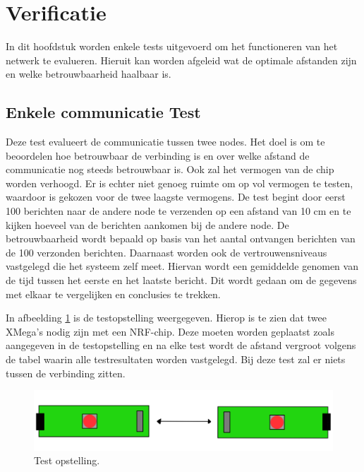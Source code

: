 \section{Verificatie}\label{sec:tests}

In dit hoofdstuk worden enkele tests uitgevoerd om het functioneren van het netwerk te evalueren. Hieruit kan worden afgeleid wat de optimale afstanden zijn en welke betrouwbaarheid haalbaar is.

\subsection{Enkele communicatie Test}
Deze test evalueert de communicatie tussen twee nodes. Het doel is om te beoordelen hoe betrouwbaar de verbinding is en over welke afstand de communicatie nog steeds betrouwbaar is. Ook zal het vermogen van de chip worden verhoogd. Er is echter niet genoeg ruimte om op vol vermogen te testen, waardoor is gekozen voor de twee laagste vermogens. De test begint door eerst 100 berichten naar de andere node te verzenden op een afstand van 10 cm en te kijken hoeveel van de berichten aankomen bij de andere node. De betrouwbaarheid wordt bepaald op basis van het aantal ontvangen berichten van de 100 verzonden berichten. Daarnaast worden ook de vertrouwensniveaus vastgelegd die het systeem zelf meet. Hiervan wordt een gemiddelde genomen van de tijd tussen het eerste en het laatste bericht. Dit wordt gedaan om de gegevens met elkaar te vergelijken en conclusies te trekken.

In afbeelding \ref{fig:TestCom} is de testopstelling weergegeven. Hierop is te zien dat twee XMega's nodig zijn met een NRF-chip. Deze moeten worden geplaatst zoals aangegeven in de testopstelling en na elke test wordt de afstand vergroot volgens de tabel waarin alle testresultaten worden vastgelegd. Bij deze test zal er niets tussen de verbinding zitten.

\begin{figure}[h]
    \centering
    \includegraphics[scale = 0.3]{img/test1.png}
    \caption{Test opstelling.}
    \label{fig:TestCom}
\end{figure}

